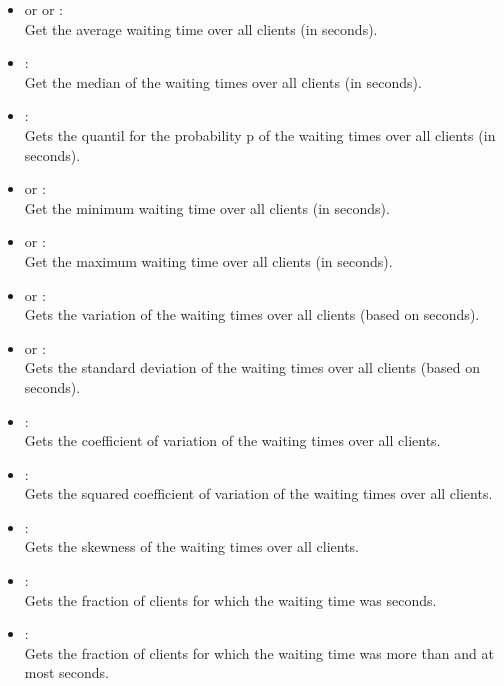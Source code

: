 \begin{itemize}

\item
{} or  or :\\
Get the average waiting time over all clients (in seconds).

\item
{}:\\
Get the median of the waiting times over all clients (in seconds).

\item
{}:\\
Gets the quantil for the probability p of the waiting times over all clients (in seconds).

\item
{} or :\\
Get the minimum waiting time over all clients (in seconds).

\item
{} or :\\
Get the maximum waiting time over all clients (in seconds).

\item
{} or :\\
Gets the variation of the waiting times over all clients (based on seconds).

\item
{} or :\\
Gets the standard deviation of the waiting times over all clients (based on seconds).

\item
{}:\\
Gets the coefficient of variation of the waiting times over all clients. 

\item
{}:\\
Gets the squared coefficient of variation of the waiting times over all clients.

\item
{}:\\
Gets the skewness of the waiting times over all clients. 

\item
{}:\\
Gets the fraction of clients for which the waiting time was  seconds.

\item
{}:\\
Gets the fraction of clients for which the waiting time was more than  and at most  seconds.

\end{itemize}  



